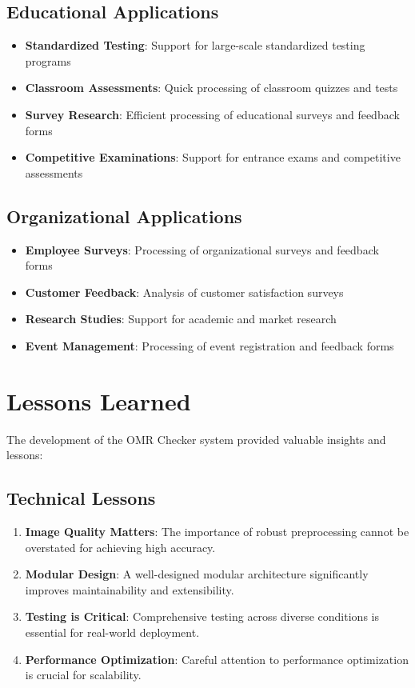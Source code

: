 \subsection{Educational Applications}

\begin{itemize}
\item \textbf{Standardized Testing}: Support for large-scale standardized testing programs
\item \textbf{Classroom Assessments}: Quick processing of classroom quizzes and tests
\item \textbf{Survey Research}: Efficient processing of educational surveys and feedback forms
\item \textbf{Competitive Examinations}: Support for entrance exams and competitive assessments
\end{itemize}

\subsection{Organizational Applications}

\begin{itemize}
\item \textbf{Employee Surveys}: Processing of organizational surveys and feedback forms
\item \textbf{Customer Feedback}: Analysis of customer satisfaction surveys
\item \textbf{Research Studies}: Support for academic and market research
\item \textbf{Event Management}: Processing of event registration and feedback forms
\end{itemize}

\section{Lessons Learned}

The development of the OMR Checker system provided valuable insights and lessons:

\subsection{Technical Lessons}

\begin{enumerate}
\item \textbf{Image Quality Matters}: The importance of robust preprocessing cannot be overstated for achieving high accuracy.

\item \textbf{Modular Design}: A well-designed modular architecture significantly improves maintainability and extensibility.

\item \textbf{Testing is Critical}: Comprehensive testing across diverse conditions is essential for real-world deployment.

\item \textbf{Performance Optimization}: Careful attention to performance optimization is crucial for scalability.
\end{enumerate}

